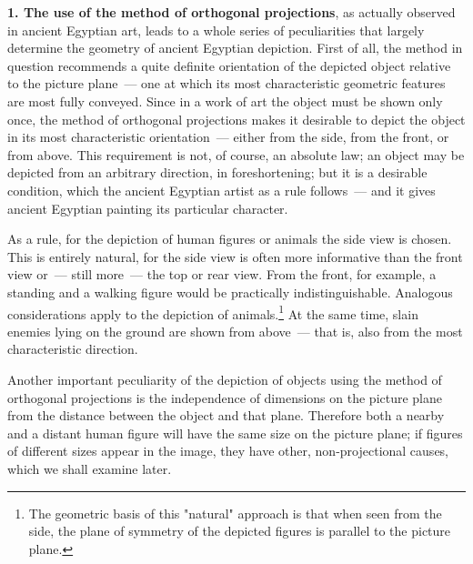 \medskip

\noindent\textbf{1. The use of the method of orthogonal projections}, as actually
observed in ancient Egyptian art, leads to a whole series of peculiarities that largely
determine the geometry of ancient Egyptian depiction. First of all, the method in
question recommends a quite definite orientation of the depicted object relative to the
picture plane~--- one at which its most characteristic geometric features are most fully
conveyed. Since in a work of art the object must be shown only once, the method of
orthogonal projections makes it desirable to depict the object in its most characteristic
orientation~--- either from the side, from the front, or from above. This requirement is
not, of course, an absolute law; an object may be depicted from an arbitrary direction,
in foreshortening; but it is a desirable condition, which the ancient Egyptian artist as a
rule follows~--- and it gives ancient Egyptian painting its particular character.

As a rule, for the depiction of human figures or animals the side view is chosen. This
is entirely natural, for the side view is often more informative than the front view or~---
still more~--- the top or rear view. From the front, for example, a standing and a walking
figure would be practically indistinguishable. Analogous considerations apply to the
depiction of animals.\footnote{%
  The geometric basis of this "natural" approach is that when seen from the side, the
  plane of symmetry of the depicted figures is parallel to the picture plane.}
At the same time, slain enemies lying on the ground are shown from above~--- that is,
also from the most characteristic direction.

Another important peculiarity of the depiction of objects using the method of
orthogonal projections is the independence of dimensions on the picture plane from the
distance between the object and that plane. Therefore both a nearby and a distant human
figure will have the same size on the picture plane; if figures of different sizes appear
in the image, they have other, non-projectional causes, which we shall examine later.



